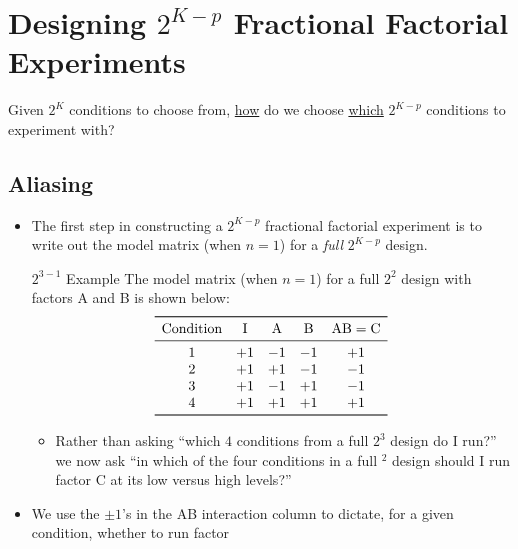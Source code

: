 \section{Designing \texorpdfstring{$ 2^{K-p} $}{2K-p} Fractional Factorial Experiments}
Given $ 2^K $ conditions to choose from, \underline{how} do we choose \underline{which}
$ 2^{K-p} $ conditions to experiment with?
\subsection{Aliasing}
\begin{itemize}
      \item The first step in constructing a $ 2^{K-p} $ fractional factorial experiment is to
            write out the model matrix (when $ n=1 $) for a \emph{full} $ 2^{K-p} $ design.
            \begin{Example}{$ 2^{3-1} $ Example}{}
                  The model matrix (when $ n=1 $) for a full $ 2^2 $ design with factors A and B is shown below:
                  \[ \begin{array}{ccccc}
                              \toprule
                              \text{Condition} & \text{I} & \text{A} & \text{B} & \text{AB}=\text{C} \\
                              \midrule
                              1                & +1       & -1       & -1       & +1                 \\
                              2                & +1       & +1       & -1       & -1                 \\
                              3                & +1       & -1       & +1       & -1                 \\
                              4                & +1       & +1       & +1       & +1                 \\
                              \bottomrule
                        \end{array} \]
            \end{Example}
            \begin{itemize}
                  \item Rather than asking ``which $4$ conditions from a full $2^3$ design do I run?'' we now ask ``in which
                        of the four conditions in a full $^2$ design should I run factor C at its low versus high levels?''
            \end{itemize}
      \item We use the $ \pm 1 $'s in the AB interaction column to dictate, for a given condition, whether to run factor

\end{itemize}
